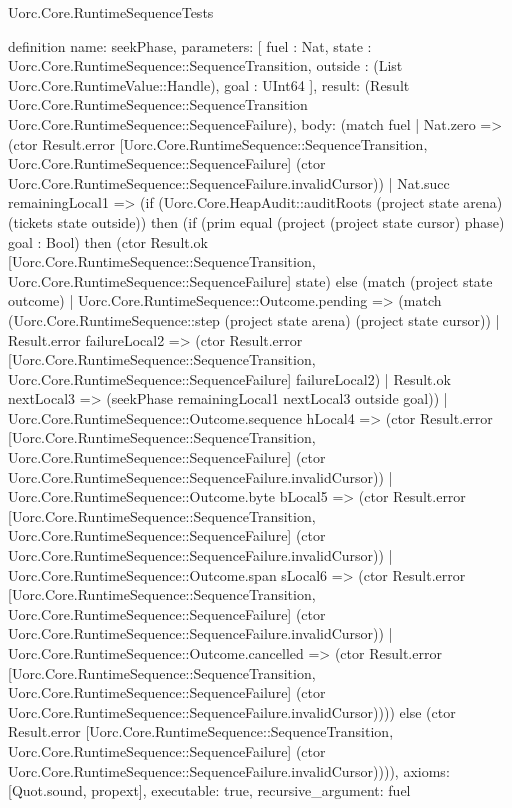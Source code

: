\begin{lexlean}{Uorc.Core.RuntimeSequenceTests}
\begin{semanticmodule}
definition{
  name: seekPhase,
  parameters: [
    fuel : Nat,
    state : Uorc.Core.RuntimeSequence::SequenceTransition,
    outside : (List Uorc.Core.RuntimeValue::Handle),
    goal : UInt64
  ],
  result: (Result Uorc.Core.RuntimeSequence::SequenceTransition Uorc.Core.RuntimeSequence::SequenceFailure),
  body: (match fuel
    | Nat.zero => (ctor Result.error [Uorc.Core.RuntimeSequence::SequenceTransition, Uorc.Core.RuntimeSequence::SequenceFailure] (ctor Uorc.Core.RuntimeSequence::SequenceFailure.invalidCursor))
    | Nat.succ remainingLocal1 => (if (Uorc.Core.HeapAudit::auditRoots (project state arena) (tickets state outside)) then (if (prim equal (project (project state cursor) phase) goal : Bool) then (ctor Result.ok [Uorc.Core.RuntimeSequence::SequenceTransition, Uorc.Core.RuntimeSequence::SequenceFailure] state) else (match (project state outcome)
      | Uorc.Core.RuntimeSequence::Outcome.pending => (match (Uorc.Core.RuntimeSequence::step (project state arena) (project state cursor))
        | Result.error failureLocal2 => (ctor Result.error [Uorc.Core.RuntimeSequence::SequenceTransition, Uorc.Core.RuntimeSequence::SequenceFailure] failureLocal2)
        | Result.ok nextLocal3 => (seekPhase remainingLocal1 nextLocal3 outside goal))
      | Uorc.Core.RuntimeSequence::Outcome.sequence hLocal4 => (ctor Result.error [Uorc.Core.RuntimeSequence::SequenceTransition, Uorc.Core.RuntimeSequence::SequenceFailure] (ctor Uorc.Core.RuntimeSequence::SequenceFailure.invalidCursor))
      | Uorc.Core.RuntimeSequence::Outcome.byte bLocal5 => (ctor Result.error [Uorc.Core.RuntimeSequence::SequenceTransition, Uorc.Core.RuntimeSequence::SequenceFailure] (ctor Uorc.Core.RuntimeSequence::SequenceFailure.invalidCursor))
      | Uorc.Core.RuntimeSequence::Outcome.span sLocal6 => (ctor Result.error [Uorc.Core.RuntimeSequence::SequenceTransition, Uorc.Core.RuntimeSequence::SequenceFailure] (ctor Uorc.Core.RuntimeSequence::SequenceFailure.invalidCursor))
      | Uorc.Core.RuntimeSequence::Outcome.cancelled => (ctor Result.error [Uorc.Core.RuntimeSequence::SequenceTransition, Uorc.Core.RuntimeSequence::SequenceFailure] (ctor Uorc.Core.RuntimeSequence::SequenceFailure.invalidCursor)))) else (ctor Result.error [Uorc.Core.RuntimeSequence::SequenceTransition, Uorc.Core.RuntimeSequence::SequenceFailure] (ctor Uorc.Core.RuntimeSequence::SequenceFailure.invalidCursor)))),
  axioms: [Quot.sound, propext],
  executable: true,
  recursive_argument: fuel
}


\end{semanticmodule}
\end{lexlean}
